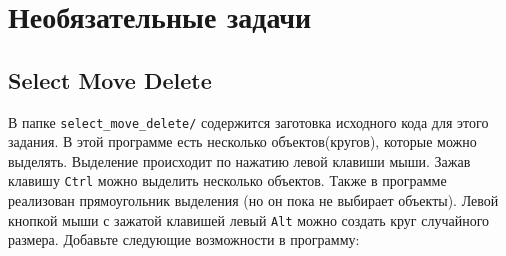 \documentclass{article}
\begin{document}
\newpage
\section*{Необязательные задачи}

\subsection{Select Move Delete}
В папке \texttt{select\_move\_delete/} содержится заготовка исходного кода для этого задания. В этой программе есть несколько объектов(кругов), которые можно выделять. Выделение происходит по нажатию левой клавиши мыши. Зажав клавишу \texttt{Ctrl} можно выделить несколько объектов. Также в программе реализован прямоугольник выделения (но он пока не выбирает объекты). Левой кнопкой мыши с зажатой клавишей левый \texttt{Alt} можно создать круг случайного размера. Добавьте следующие возможности в программу:
\end{document}
